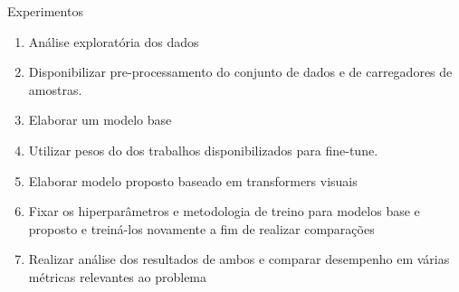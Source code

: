 \documentclass{beamer}
\begin{document}
\begin{frame}{Experimentos}
    \begin{enumerate}
        \item   Análise exploratória dos dados
        \item   Disponibilizar pre-processamento do conjunto de dados e de carregadores de amostras.
        \item   Elaborar um modelo base
        \item   Utilizar pesos do dos trabalhos disponibilizados para fine-tune. 
        \item   Elaborar modelo proposto baseado em transformers visuais
        \item   Fixar os hiperparâmetros e metodologia de treino para modelos base e proposto e treiná-los novamente a fim de realizar comparações
        \item   Realizar análise dos resultados de ambos e comparar desempenho em várias métricas relevantes ao problema
        \end{enumerate}
        
\end{frame}
\end{document}
